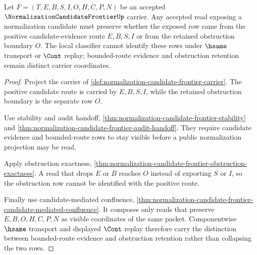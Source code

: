 \begin{theorem}
\label{thm:normalization-candidate-frontier-nontrivial-witness}
Let $F=(T,E,B,S,I,O,H,C,P,N)$ be an accepted $\NormalizationCandidateFrontierUp$ carrier. Any accepted read exposing a normalization candidate must preserve whether the exposed row came from the positive candidate-evidence route $E,B,S,I$ or from the retained obstruction boundary $O$. The local classifier cannot identify these rows under $\hsame$ transport or $\Cont$ replay; bounded-route evidence and obstruction retention remain distinct carrier coordinates.
\end{theorem}
\begin{proof}
Project the carrier of \autoref{def:normalization-candidate-frontier-carrier}. The positive candidate route is carried by $E,B,S,I$, while the retained obstruction boundary is the separate row $O$.

Use stability and audit handoff, \autoref{thm:normalization-candidate-frontier-stability} and \autoref{thm:normalization-candidate-frontier-audit-handoff}. They require candidate evidence and bounded-route rows to stay visible before a public normalization projection may be read.

Apply obstruction exactness, \autoref{thm:normalization-candidate-frontier-obstruction-exactness}. A read that drops $E$ or $B$ reaches $O$ instead of exporting $S$ or $I$, so the obstruction row cannot be identified with the positive route.

Finally use candidate-mediated confluence, \autoref{thm:normalization-candidate-frontier-candidate-mediated-confluence}. It composes only reads that preserve $E,B,O,H,C,P,N$ as visible coordinates of the same packet. Componentwise $\hsame$ transport and displayed $\Cont$ replay therefore carry the distinction between bounded-route evidence and obstruction retention rather than collapsing the two rows.
\end{proof}



